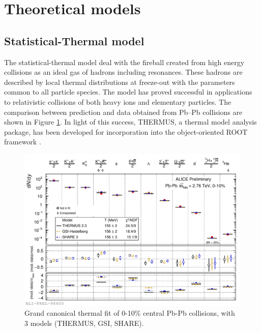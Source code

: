 \section{Theoretical models}\label{sec:model}
\subsection{Statistical-Thermal  model}

The statistical-thermal model deal with the fireball created from high energy collisions as an ideal gas of hadrons including resonances. These hadrons are described by local thermal distributions at freeze-out with the parameters common to all particle species. The model has proved successful in applications to relativistic collisions of both heavy ions and elementary particles. The comparison between prediction and data obtained from Pb--Pb collisions are shown in Figure \ref{fig:thermal}. In light of this success, THERMUS, a thermal model analysis package, has been developed for incorporation into the object-oriented ROOT framework \cite{Wheaton:2004qb}.\\ 

\begin{figure}[htbp]
\begin{center}
\includegraphics[width=14.cm]{./Version1/FigChapter2/ThermalModel}
\caption{Grand canonical thermal fit of 0-10\% central Pb-Pb collisions, with 3 models (THERMUS, GSI, SHARE). %
}
\label{fig:thermal}
\end{center}
\end{figure}


